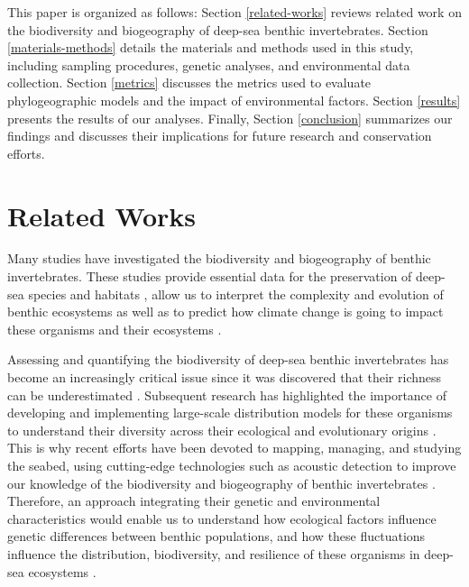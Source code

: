 This paper is organized as follows: Section \autoref{related-works} reviews related work on the biodiversity and biogeography of deep-sea benthic invertebrates. Section \autoref{materials-methods} details the materials and methods used in this study, including sampling procedures, genetic analyses, and environmental data collection. Section \autoref{metrics} discusses the metrics used to evaluate phylogeographic models and the impact of environmental factors. Section \autoref{results} presents the results of our analyses. Finally, Section \autoref{conclusion} summarizes our findings and discusses their implications for future research and conservation efforts.

\section{Related Works}\label{related-works}
Many studies have investigated the biodiversity and biogeography of benthic invertebrates. These studies provide essential data for the preservation of deep-sea species and habitats \citep{halpern2008global}, allow us to interpret the complexity and evolution of benthic ecosystems \citep{danovaro2008exponential} as well as to predict how climate change is going to impact these organisms and their ecosystems \citep{cheung2009projecting}. 

Assessing and quantifying the biodiversity of deep-sea benthic invertebrates has become an increasingly critical issue since it was discovered that their richness can be underestimated \citep{grassle1992deep}. Subsequent research has highlighted the importance of developing and implementing large-scale distribution models for these organisms to understand their diversity across their ecological and evolutionary origins \citep{rex1997large}. This is why recent efforts have been devoted to mapping, managing, and studying the seabed, using cutting-edge technologies such as acoustic detection to improve our knowledge of the biodiversity and biogeography of benthic invertebrates \citep{brown2011benthic}. Therefore, an approach integrating their genetic and environmental characteristics would enable us to understand how ecological factors influence genetic differences between benthic populations, and how these fluctuations influence the distribution, biodiversity, and resilience of these organisms in deep-sea ecosystems \citep{etter1990population, smith2003deep, vrijenhoek2009cryptic}.

